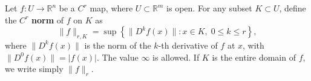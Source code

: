 Let $f: U \to \mathbb{R}^n$ be a $C^r$ map, where $U \subset \mathbb{R}^m$ is open. For any subset $K \subset U$, define the $C^r$ \textbf{norm} of $f$ on $K$ as
$$
\|f\|_{r, K} = \sup \left\{ \|D^k f(x)\| : x \in K,\; 0 \leqslant k \leqslant r \right\},
$$
where $\|D^k f(x)\|$ is the norm of the $k$-th derivative of $f$ at $x$, with $\|D^0 f(x)\| = |f(x)|$. The value $\infty$ is allowed. If $K$ is the entire domain of $f$, we write simply $\|f\|_r$.
